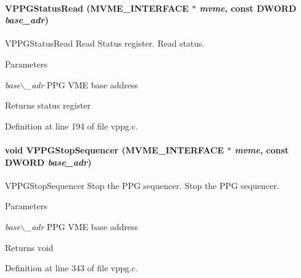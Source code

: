 \paragraph[{VPPGStatusRead}]{ VPPGStatusRead ({\bf MVME\_\-INTERFACE} $\ast$ {\em mvme}, \/  const {\bf DWORD} {\em base\_\-adr})}\hfill\label{vppg_8h_a23fc7a80ad391f80fc10a97417519980}
VPPGStatusRead Read Status register.  Read status. 
\begin{DoxyParams}{Parameters}
\item[{\em base$\backslash$\_\-adr}]PPG VME base address \end{DoxyParams}
\begin{DoxyReturn}{Returns}
status register 
\end{DoxyReturn}


Definition at line 194 of file vppg.c.
\paragraph[{VPPGStopSequencer}]{\setlength{\rightskip}{0pt plus 5cm}void VPPGStopSequencer ({\bf MVME\_\-INTERFACE} $\ast$ {\em mvme}, \/  const {\bf DWORD} {\em base\_\-adr})}\hfill\label{vppg_8h_acabc3ac9c2749e8ad0d503643f3e48e3}
VPPGStopSequencer Stop the PPG sequencer.  Stop the PPG sequencer. 
\begin{DoxyParams}{Parameters}
\item[{\em base$\backslash$\_\-adr}]PPG VME base address \end{DoxyParams}
\begin{DoxyReturn}{Returns}
void 
\end{DoxyReturn}


Definition at line 343 of file vppg.c.